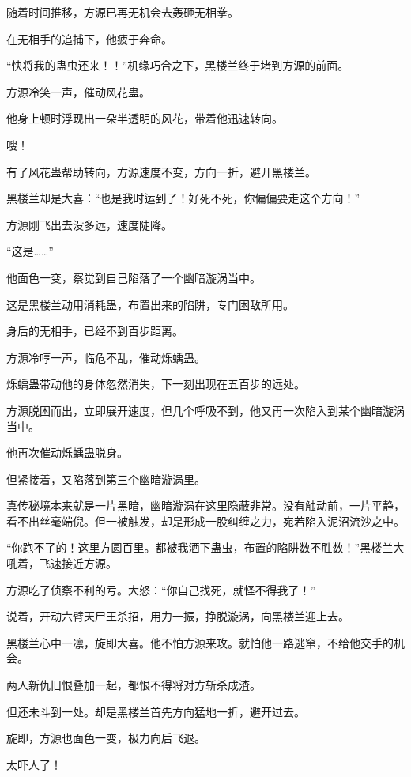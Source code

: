 
\begin{this_body}

随着时间推移，方源已再无机会去轰砸无相拳。

在无相手的追捕下，他疲于奔命。

“快将我的蛊虫还来！！”机缘巧合之下，黑楼兰终于堵到方源的前面。

方源冷笑一声，催动风花蛊。

他身上顿时浮现出一朵半透明的风花，带着他迅速转向。

嗖！

有了风花蛊帮助转向，方源速度不变，方向一折，避开黑楼兰。

黑楼兰却是大喜：“也是我时运到了！好死不死，你偏偏要走这个方向！”

方源刚飞出去没多远，速度陡降。

“这是……”

他面色一变，察觉到自己陷落了一个幽暗漩涡当中。

这是黑楼兰动用消耗蛊，布置出来的陷阱，专门困敌所用。

身后的无相手，已经不到百步距离。

方源冷哼一声，临危不乱，催动烁蝺蛊。

烁蝺蛊带动他的身体忽然消失，下一刻出现在五百步的远处。

方源脱困而出，立即展开速度，但几个呼吸不到，他又再一次陷入到某个幽暗漩涡当中。

他再次催动烁蝺蛊脱身。

但紧接着，又陷落到第三个幽暗漩涡里。

真传秘境本来就是一片黑暗，幽暗漩涡在这里隐蔽非常。没有触动前，一片平静，看不出丝毫端倪。但一被触发，却是形成一股纠缠之力，宛若陷入泥沼流沙之中。

“你跑不了的！这里方圆百里。都被我洒下蛊虫，布置的陷阱数不胜数！”黑楼兰大吼着，飞速接近方源。

方源吃了侦察不利的亏。大怒：“你自己找死，就怪不得我了！”

说着，开动六臂天尸王杀招，用力一振，挣脱漩涡，向黑楼兰迎上去。

黑楼兰心中一凛，旋即大喜。他不怕方源来攻。就怕他一路逃窜，不给他交手的机会。

两人新仇旧恨叠加一起，都恨不得将对方斩杀成渣。

但还未斗到一处。却是黑楼兰首先方向猛地一折，避开过去。

旋即，方源也面色一变，极力向后飞退。

太吓人了！


\end{this_body}
